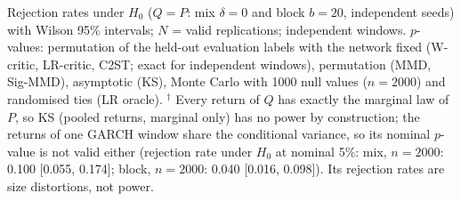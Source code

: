 Rejection rates under $H_0$ ($Q=P$: mix $\delta=0$ and block $b=20$, independent seeds) with Wilson 95\% intervals; $N$ = valid replications; independent windows.
$p$-values: permutation of the held-out evaluation labels with the network fixed (W-critic, LR-critic, C2ST; exact for independent windows), permutation (MMD, Sig-MMD), asymptotic (KS), Monte Carlo with 1000 null values ($n=2000$) and randomised ties (LR oracle).
$^{\dagger}$ Every return of $Q$ has exactly the marginal law of $P$, so KS (pooled returns, marginal only) has no power by construction; the returns of one GARCH window share the conditional variance, so its nominal $p$-value is not valid either (rejection rate under $H_0$ at nominal 5\%: mix, $n=2000$: 0.100 [0.055, 0.174]; block, $n=2000$: 0.040 [0.016, 0.098]). Its rejection rates are size distortions, not power.
